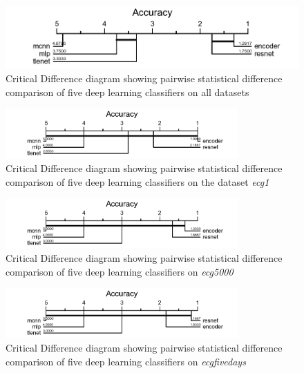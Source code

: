 \documentclass[journal]{IEEEtran}
\begin{document}
\begin{figure}[h]
    \centering
    \includegraphics[width=\textwidth]{assets/all_models_all_runs.png}
    
    \caption{Critical Difference diagram showing pairwise statistical difference comparison of five deep learning classifiers on all datasets}
    \label{fig:wilcoxon-all-datasets}
\end{figure}

\begin{figure}[h]
    \centering
    \includegraphics[width=3.5in]{assets/all_models_ecg1.png}
    
    \caption{Critical Difference diagram showing pairwise statistical difference comparison of five deep learning classifiers on the dataset \textit{ecg1}}
    \label{fig:wilcoxon-ecg1}
\end{figure}



\begin{figure}[h]
    \centering
    \includegraphics[width=3.5in]{assets/all_models_ecg5000.png}
    
    \caption{Critical Difference diagram showing pairwise statistical difference comparison of five deep learning classifiers on \textit{ecg5000}}
    \label{fig:wilcoxon-ecg5000}
\end{figure}



\begin{figure}[h]
    \centering
    \includegraphics[width=3.5in]{assets/all_models_ecgfivedays.png}
    
    \caption{Critical Difference diagram showing pairwise statistical difference comparison of five deep learning classifiers on \textit{ecgfivedays}}
    \label{fig:wilcoxon-ecgfivedays}
\end{figure}
\end{document}
